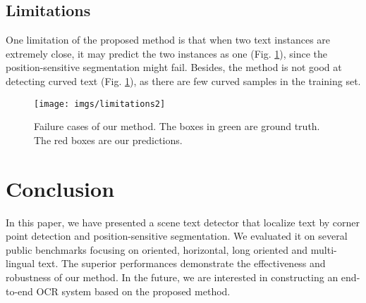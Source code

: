 \documentclass[10pt,twocolumn,letterpaper]{article}
\begin{document}
\vspace{-0.1cm}

\subsection{Limitations}
\vspace{-0.1cm}
One limitation of the proposed method is that when two text instances are extremely close, it may predict the two instances as one (Fig. \ref{img_limit}), since the position-sensitive segmentation might fail. Besides, the method is not good at detecting curved text (Fig. \ref{img_limit}), as there are few curved samples in the training set.

\begin{figure}

\begin{centering}
\texttt{[image: imgs/limitations2]}
\par\end{centering}
\caption{Failure cases of our method. The boxes in green are ground truth. The red boxes are our predictions.}
\label{img_limit}
\vspace{-4mm}
\end{figure}

\vspace{-0.1cm}
\section{Conclusion}
\vspace{-0.1cm}

In this paper, we have presented a scene text detector that localize text by corner point detection and position-sensitive segmentation. We evaluated it on several public benchmarks focusing on oriented, horizontal, long oriented and multi-lingual text. The superior performances demonstrate the effectiveness and robustness of our method. In the future, we are interested in constructing an end-to-end OCR system based on the proposed method.

\vspace{-1mm}
{
\small


}
\end{document}
